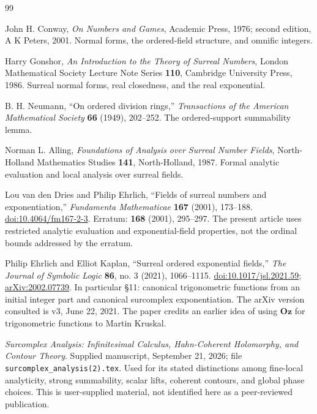 \documentclass[11pt,letterpaper]{article}
\theoremstyle{definition}
\theoremstyle{remark}
\newcommand{\Oz}{\mathbf{Oz}}
\numberwithin{equation}{section}
\begin{document}
\begin{thebibliography}{99}

John H. Conway,
\emph{On Numbers and Games},
Academic Press, 1976; second edition, A K Peters, 2001.
Normal forms, the ordered-field structure, and omnific integers.

Harry Gonshor,
\emph{An Introduction to the Theory of Surreal Numbers},
London Mathematical Society Lecture Note Series \textbf{110},
Cambridge University Press, 1986.
Surreal normal forms, real closedness, and the real exponential.

B. H. Neumann,
``On ordered division rings,''
\emph{Transactions of the American Mathematical Society} \textbf{66} (1949), 202--252.
The ordered-support summability lemma.

Norman L. Alling,
\emph{Foundations of Analysis over Surreal Number Fields},
North-Holland Mathematics Studies \textbf{141},
North-Holland, 1987.
Formal analytic evaluation and local analysis over surreal fields.

Lou van den Dries and Philip Ehrlich,
``Fields of surreal numbers and exponentiation,''
\emph{Fundamenta Mathematicae} \textbf{167} (2001), 173--188.
\href{https://doi.org/10.4064/fm167-2-3}{doi:10.4064/fm167-2-3}.
Erratum: \textbf{168} (2001), 295--297.
The present article uses restricted analytic evaluation and exponential-field properties, not the ordinal bounds addressed by the erratum.

Philip Ehrlich and Elliot Kaplan,
``Surreal ordered exponential fields,''
\emph{The Journal of Symbolic Logic} \textbf{86}, no. 3 (2021), 1066--1115.
\href{https://doi.org/10.1017/jsl.2021.59}{doi:10.1017/jsl.2021.59};
\href{https://arxiv.org/abs/2002.07739}{arXiv:2002.07739}.
In particular \S11: canonical trigonometric functions from an initial integer part and canonical surcomplex exponentiation. The arXiv version consulted is v3, June 22, 2021. The paper credits an earlier idea of using $\Oz$ for trigonometric functions to Martin Kruskal.

\emph{Surcomplex Analysis: Infinitesimal Calculus, Hahn-Coherent Holomorphy, and Contour Theory}.
Supplied manuscript, September 21, 2026;
file \texttt{surcomplex\_analysis(2).tex}.
Used for its stated distinctions among fine-local analyticity, strong summability, scalar lifts, coherent contours, and global phase choices. This is user-supplied material, not identified here as a peer-reviewed publication.


\end{thebibliography}
\end{document}
